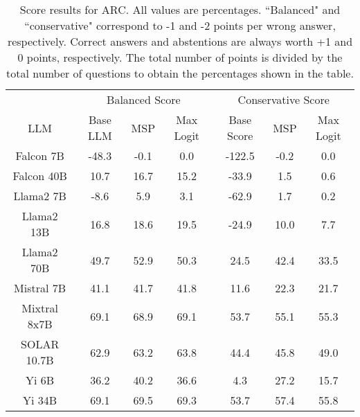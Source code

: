 \renewcommand\arraystretch{1.2}
\begin{table*}
\centering
\begin{tabular}{c|c|c|c|c|c|c}
& \multicolumn{3}{c|}{Balanced Score} & \multicolumn{3}{c}{Conservative Score} \\ 
LLM & Base LLM & MSP & Max Logit & Base Score & MSP & Max Logit\\ \hline
Falcon 7B & -48.3 & -0.1 & 0.0 & -122.5 & -0.2 & 0.0\\
Falcon 40B & 10.7 & 16.7 & 15.2 & -33.9 & 1.5 & 0.6\\
Llama2 7B & -8.6 & 5.9 & 3.1 & -62.9 & 1.7 & 0.2\\
Llama2 13B & 16.8 & 18.6 & 19.5 & -24.9 & 10.0 & 7.7\\
Llama2 70B & 49.7 & 52.9 & 50.3 & 24.5 & 42.4 & 33.5\\
Mistral 7B & 41.1 & 41.7 & 41.8 & 11.6 & 22.3 & 21.7\\
Mixtral 8x7B & 69.1 & 68.9 & 69.1 & 53.7 & 55.1 & 55.3\\
SOLAR 10.7B & 62.9 & 63.2 & 63.8 & 44.4 & 45.8 & 49.0\\
Yi 6B & 36.2 & 40.2 & 36.6 & 4.3 & 27.2 & 15.7\\
Yi 34B & 69.1 & 69.5 & 69.3 & 53.7 & 57.4 & 55.8\\
\hline
\end{tabular}
\caption{Score results for ARC. All values are percentages. ``Balanced" and ``conservative" correspond to -1 and -2 points per wrong answer, respectively. Correct answers and abstentions are always worth +1 and 0 points, respectively. The total number of points is divided by the total number of questions to obtain the percentages shown in the table.}
\label{tab:arc_score}
\end{table*}
